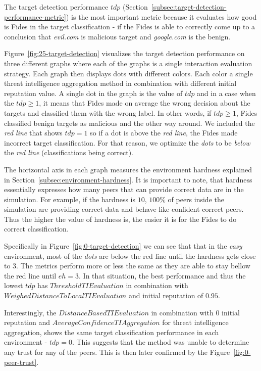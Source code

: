 The target detection performance $tdp$ (Section~\ref{subsec:target-detection-performance-metric}) is the most important metric because it evaluates how good is Fides in the target classification - if the Fides is able to correctly come up to a conclusion that \textit{evil.com} is malicious target and \textit{google.com} is the benign.

Figure~\ref{fig:25-target-detection} visualizes the target detection performance on three different graphs where each of the graphs is a single interaction evaluation strategy.
Each graph then displays dots with different colors. Each color a single threat intelligence aggregation method in combination with different initial reputation value.
A single dot in the graph is the value of $tdp$ and in a case when the $tdp \geq 1$, it means that Fides made on average the wrong decision about the targets and classified them with the wrong label.
In other words, if $tdp \geq 1$, Fides classified benign targets as malicious and the other way around.
We included the \textit{red line} that shows $tdp = 1$ so if a dot is above the \textit{red line}, the Fides made incorrect target classification.
For that reason, we optimize the \textit{dots} to be \textit{below} the \textit{red line} (classifications being correct).

The horizontal axis in each graph measures the environment hardness explained in Section~\ref{subsec:environment-hardness}. It is important to note, that hardness essentially expresses how many peers that can provide correct data are in the simulation. For example, if the hardness is $10$, $100\%$ of peers inside the simulation are providing correct data and behave like confident correct peers.
Thus the higher the value of hardness is, the easier it is for the Fides to do correct classification.

Specifically in Figure~\ref{fig:0-target-detection} we can see that that in the \textit{easy} environment, most of the \textit{dots} are below the red line until the hardness gets close to $3$.
The metrics perform more or less the same as they are able to stay bellow the red line until $eh = 3$. In that situation, the best performance and thus the lowest $tdp$ has $ThresholdTIEvaluation$ in combination with $WeighedDistanceToLocalTIEvaluation$ and initial reputation of $0.95$.

Interestingly, the $DistanceBasedTIEvaluation$ in combination with $0$ initial reputation and $AverageConfidenceTIAggregation$ for threat intelligence aggregation, shows the same target classification performance in each environment - $tdp = 0$. This suggests that the method was unable to determine any trust for any of the peers. This is then later confirmed by the Figure~\ref{fig:0-peer-trust}.

